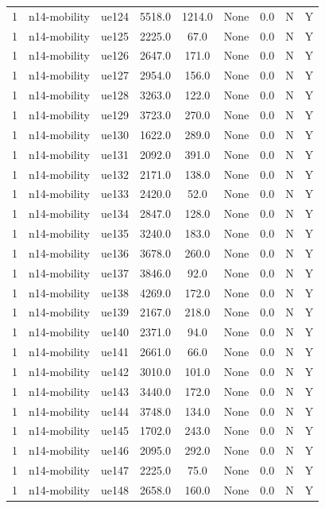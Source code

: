 \begin{table}[ht]
\begin{tabular}{|c|c|c|c|c|c|c|c|c|}
1 & n14-mobility & ue124 & 5518.0 & 1214.0 & None & 0.0 & N & Y \\
1 & n14-mobility & ue125 & 2225.0 & 67.0 & None & 0.0 & N & Y \\
1 & n14-mobility & ue126 & 2647.0 & 171.0 & None & 0.0 & N & Y \\
1 & n14-mobility & ue127 & 2954.0 & 156.0 & None & 0.0 & N & Y \\
1 & n14-mobility & ue128 & 3263.0 & 122.0 & None & 0.0 & N & Y \\
1 & n14-mobility & ue129 & 3723.0 & 270.0 & None & 0.0 & N & Y \\
1 & n14-mobility & ue130 & 1622.0 & 289.0 & None & 0.0 & N & Y \\
1 & n14-mobility & ue131 & 2092.0 & 391.0 & None & 0.0 & N & Y \\
1 & n14-mobility & ue132 & 2171.0 & 138.0 & None & 0.0 & N & Y \\
1 & n14-mobility & ue133 & 2420.0 & 52.0 & None & 0.0 & N & Y \\
1 & n14-mobility & ue134 & 2847.0 & 128.0 & None & 0.0 & N & Y \\
1 & n14-mobility & ue135 & 3240.0 & 183.0 & None & 0.0 & N & Y \\
1 & n14-mobility & ue136 & 3678.0 & 260.0 & None & 0.0 & N & Y \\
1 & n14-mobility & ue137 & 3846.0 & 92.0 & None & 0.0 & N & Y \\
1 & n14-mobility & ue138 & 4269.0 & 172.0 & None & 0.0 & N & Y \\
1 & n14-mobility & ue139 & 2167.0 & 218.0 & None & 0.0 & N & Y \\
1 & n14-mobility & ue140 & 2371.0 & 94.0 & None & 0.0 & N & Y \\
1 & n14-mobility & ue141 & 2661.0 & 66.0 & None & 0.0 & N & Y \\
1 & n14-mobility & ue142 & 3010.0 & 101.0 & None & 0.0 & N & Y \\
1 & n14-mobility & ue143 & 3440.0 & 172.0 & None & 0.0 & N & Y \\
1 & n14-mobility & ue144 & 3748.0 & 134.0 & None & 0.0 & N & Y \\
1 & n14-mobility & ue145 & 1702.0 & 243.0 & None & 0.0 & N & Y \\
1 & n14-mobility & ue146 & 2095.0 & 292.0 & None & 0.0 & N & Y \\
1 & n14-mobility & ue147 & 2225.0 & 75.0 & None & 0.0 & N & Y \\
1 & n14-mobility & ue148 & 2658.0 & 160.0 & None & 0.0 & N & Y \\

\end{tabular}
\end{table}
